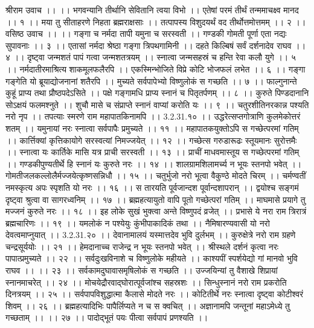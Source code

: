 श्रीराम उवाच ।। ।।
भगवन्यानि तीर्थानि सेवितानि त्वया विभो ।।
एतेषां परमं तीर्थं तन्ममाचक्ष्व मानद ।। १ ।।
मया तु सीताहरणे निहता ब्रह्मराक्षसाः ।।
तत्पापस्य विशुदयर्थं वद तीर्थोत्तमोत्तमम् ।। २ ।।
वसिष्ठ उवाच ।। ।।
गङ्गा च नर्मदा तापी यमुना च सरस्वती ।।
गण्डकी गोमती पूर्णा एता नद्यः सुपावनाः ।। ३ ।।
एतासां नर्मदा श्रेष्ठा गङ्गा त्रिपथगामिनी ।।
दहते किल्बिषं सर्वं दर्शनादेव राघव ।। ४ ।।
दृष्ट्वा जन्मशतं पापं गत्वा जन्मशतत्रयम् ।।
स्नात्वा जन्मसहस्रं च हन्ति रेवा कलौ युगे ।। ५ ।।
नर्मदातीरमाश्रित्य शाकमूलफलैरपि ।।
एकस्मिन्भोजिते विप्रे कोटि भोजफलं लभेत ।। ६ ।।
गङ्गा गङ्गेति यो ब्रूयाद्योजनानां शतैरपि ।।
मुच्यते सर्वपापेभ्यो विष्णुलोकं स गच्छति ।। ७ ।।
फाल्गुनान्ते कुहूं प्राप्य तथा प्रौष्ठपदेऽसिते ।।
पक्षे गङ्गामधि प्राप्य स्नानं च पितृतर्पणम् ।। ८ ।।
कुरुते पिण्डदानानि सोऽक्षयं फलमश्नुते ।।
शुचौ मासे च संप्राप्ते स्नानं वाप्यां करोति यः ।। ९ ।।
चतुरशीतिनरकान्न पश्यति नरो नृप ।।
तपत्याः स्मरणे राम महापातकिनामपि ।। 3.2.31.१० ।।
उद्धरेत्सप्तगोत्राणि कुलमेकोत्तरं शतम् ।।
यमुनायां नरः स्नात्वा सर्वपापैः प्रमुच्यते ।। ११ ।।
महापातकयुक्तोऽपि स गच्छेत्परमां गतिम् ।।
कार्त्तिक्यां कृत्तिकायोगे सरस्वत्यां निमज्जयेत् ।। १२ ।।
गच्छेत्स गरुडारूढः स्तूयमानः सुरोत्तमैः ।।
स्नात्वा यः कार्तिके मासि यत्र प्राची सरस्वती ।। १३ ।।
प्राचीं माधवमास्तूय स गच्छेत्परमां गतिम् ।।
गण्डकीपुण्यतीर्थे हि स्नानं यः कुरुते नरः ।। १४ ।।
शालग्रामशिलामर्च्य न भूयः स्तनपो भवेत् ।।
गोमतीजलकल्लोलैर्मज्जयेत्कृष्णसन्निधौ ।। १५ ।।
चतुर्भुजो नरो भूत्वा वैकुण्ठे मोदते चिरम् ।।
चर्मण्वतीं नमस्कृत्य अपः स्पृशति यो नरः ।। १६ ।।
स तारयति पूर्वजान्दश पूर्वान्दशापरान् ।।
द्वयोश्च सङ्गमं दृष्ट्वा श्रुत्वा वा सागरध्वनिम् ।। १७ ।।
ब्रह्महत्यायुतो वापि पूतो गच्छेत्परां गतिम् ।।
माघमासे प्रयागे तु मज्जनं कुरुते नरः ।। १८ ।।
इह लोके सुखं भुक्त्वा अन्ते विष्णुपदं व्रजेत् ।।
प्रभासे ये नरा राम त्रिरात्रं ब्रह्मचारिणः ।। १९ ।।
यमलोकं न पश्येयुः कुंभीपाकादिकं तथा ।।
नैमिषारण्यवासी यो नरो देवत्वमाप्नुयात् ।। 3.2.31.२० ।।
देवानामालयं यस्मात्तदेव भुवि दुर्लभम् ।।
कुरुक्षेत्रे नरो राम ग्रहणे चन्द्रसूर्ययोः ।। २१ ।।
हेमदानाच्च राजेन्द्र न भूयः स्तनपो भवेत् ।।
श्रीस्थले दर्शनं कृत्वा नरः पापात्प्रमुच्यते ।। २२ ।।
सर्वदुःखविनाशे च विष्णुलोके महीयते ।।
काश्यपीं स्पर्शयेद्यो गां मानवो भुवि राघव ।। ।। २३ ।।
सर्वकामदुघावासमृषिलोकं स गच्छति ।।
उज्जयिन्यां तु वैशाखे शिप्रायां स्नानमाचरेत् ।। २४ ।।
मोचयेद्रौरवाद्घोरात्पूर्वजांश्च सहस्रशः ।।
सिन्धुस्नानं नरो राम प्रकरोति दिनत्रयम् ।। २५ ।।
सर्वपापविशुद्धात्मा कैलासे मोदते नरः ।।
कोटितीर्थे नरः स्नात्वा दृष्ट्वा कोटीश्वरं शिवम् ।। २६ ।।
ब्रह्महत्यादिभिः पापैर्लिप्यते न च स क्वचित् ।।
अज्ञानामपि जन्तूनां महाऽमेध्ये तु गच्छताम् ।। ।। २७ ।।
पादोद्भूतं पयः पीत्वा सर्वपापं प्रणश्यति ।।
